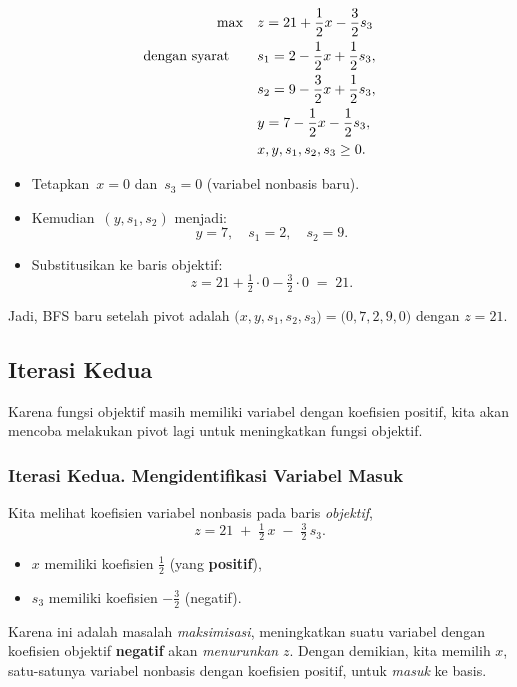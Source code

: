 \begin{tcolorbox}[colback=algpivot!6, colframe=algpivot, coltitle=white, fonttitle=\bfseries, sharp corners, title={\ding{114}\ Pivot: Kamus Kedua}]

\[
\begin{aligned}
\max\quad 
& z =  21 + \frac{1}{2}x - \frac{3}{2}s_3 \\
\mbox{dengan syarat}\quad\quad 
& s_1  = 2 - \frac{1}{2}x + \frac{1}{2}s_3, \\
& s_2  = 9 - \frac{3}{2}x + \frac{1}{2}s_3, \\
& y = 7 - \frac{1}{2}x - \frac{1}{2}s_3, \\
& x, y, s_1, s_2, s_3 \ge 0.
\end{aligned}
\]

\begin{itemize}
  \item Tetapkan \(\,x=0\) dan \(\,s_3=0\) (variabel nonbasis baru). 
  \item Kemudian \(\,(y,s_1,s_2)\) menjadi:
  \[
  y = 7, 
  \quad
  s_1 = 2,
  \quad
  s_2 = 9.
  \]
  \item Substitusikan ke baris objektif:
  \[
  z = 21 + \tfrac12\cdot 0 - \tfrac32\cdot 0 \;=\; 21.
  \]
\end{itemize}
Jadi, BFS baru setelah pivot adalah 
\(\bigl(x,y,s_1,s_2,s_3\bigr) = \bigl(0,7,2,9,0\bigr)\) 
dengan \(z=21\).
\end{tcolorbox}

\subsection*{Iterasi Kedua}
Karena fungsi objektif masih memiliki variabel dengan koefisien positif, kita akan mencoba melakukan pivot lagi untuk meningkatkan fungsi objektif.

\subsubsection*{Iterasi Kedua. Mengidentifikasi Variabel Masuk}
\begin{tcolorbox}[colback=algenter!6, colframe=algenter, coltitle=white, fonttitle=\bfseries, sharp corners, title={\ding{43}\ Iterasi Kedua: Variabel Masuk}]
Kita melihat koefisien variabel nonbasis pada baris \emph{objektif},
\[
z = 21 \;+\; \tfrac12\,x \;-\;\tfrac32\,s_3.
\]
\begin{itemize}
  \item \(x\) memiliki koefisien \(\tfrac12\) (yang \textbf{positif}), 
  \item \(s_3\) memiliki koefisien \(-\tfrac32\) (negatif).
\end{itemize}
Karena ini adalah masalah \emph{maksimisasi}, meningkatkan suatu variabel dengan koefisien objektif \textbf{negatif} akan \emph{menurunkan} \(z\).  
Dengan demikian, kita memilih \(x\), satu-satunya variabel nonbasis dengan koefisien positif, untuk \emph{masuk} ke basis.
\end{tcolorbox}
